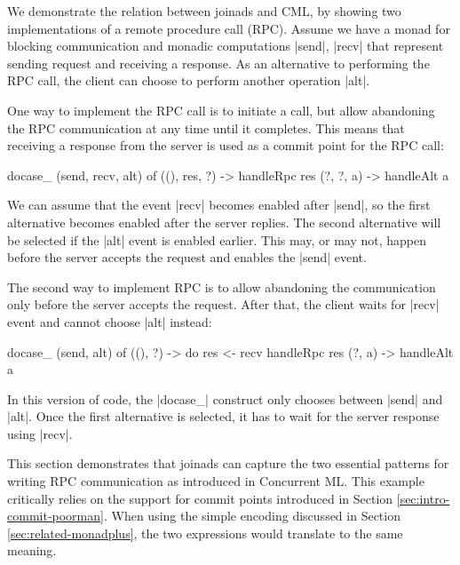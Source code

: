 \documentclass{sigplanconf}
\begin{document}
We demonstrate the relation between joinads and CML, by showing two implementations of a 
remote procedure call (RPC). Assume we have a monad for blocking communication
and monadic computations |send|, |recv| that represent sending request and receiving a response. As an 
alternative to performing the RPC call, the client can choose to perform another operation |alt|.

One way to implement the RPC call is to initiate a call, but allow abandoning the RPC communication
at any time until it completes. This means that receiving a response from the server is used
as a commit point for the RPC call:

\begin{code}
docase_ (send, recv, alt) of
  ((), res, ?)  -> handleRpc res
  (?, ?, a)     -> handleAlt a
\end{code}
We can assume that the event |recv| becomes enabled after |send|, so the first alternative becomes
enabled after the server replies. The second alternative will be selected if the |alt| event is
enabled earlier. This may, or may not, happen before the server accepts the request and 
enables the |send| event.

The second way to implement RPC is to allow abandoning the communication only before the server 
accepts the request. After that, the client waits for |recv| event and cannot choose |alt| instead:

\begin{code}
docase_ (send, alt) of
  ((), ?)  ->  do res <- recv
               handleRpc res
  (?, a)   ->  handleAlt a
\end{code}
In this version of code, the |docase_| construct only chooses between |send| and |alt|. Once the
first alternative is selected, it has to wait for the server response using |recv|.

This section demonstrates that joinads can capture the two essential patterns for writing RPC
communication as introduced in Concurrent ML. This example critically relies on the support for
commit points introduced in Section \ref{sec:intro-commit-poorman}. When using the simple encoding
discussed in Section \ref{sec:related-monadplus}, the two expressions would translate to the 
same meaning.

\end{document}
